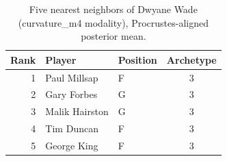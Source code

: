 \begin{table}[htbp]
  \centering\small
  \begin{tabular}{rllc}
    \toprule
    Rank & Player & Position & Archetype \\
    \midrule
    1 & Paul Millsap & F & 3 \\
    2 & Gary Forbes & G & 3 \\
    3 & Malik Hairston & G & 3 \\
    4 & Tim Duncan & F & 3 \\
    5 & George King & F & 3 \\
    \bottomrule
  \end{tabular}
  \caption{Five nearest neighbors of Dwyane Wade (curvature_m4 modality), Procrustes-aligned posterior mean.}
  \label{tab:Dwyane_Wade_neighbors_curvature_m4}
\end{table}

